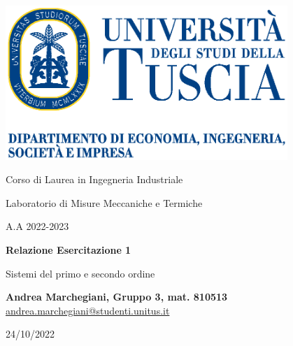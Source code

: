 \documentclass[a4paper, 12pt, twoside]{report}
\begin{document}
			\begin{titlepage}
				\begin{center}
					
					\includegraphics[width=0.8\textwidth]{figures/unitus_marchio_2020_DEIM}
					
					\vspace{0.5cm}
					
					{\Large Corso di Laurea in Ingegneria Industriale}
					
					\vspace{0.5cm}
					
					{\Large Laboratorio di Misure Meccaniche e Termiche}
					
					\vspace{0.5cm}
					
					{\Large A.A 2022-2023}
					
					\vspace{1.5cm}
					
					\textbf{{\Huge Relazione Esercitazione 1}}
					
					\vspace{0.5cm}
					{\LARGE Sistemi del primo e secondo ordine}
					
					\vspace{1.5cm}
					
					\textbf{Andrea Marchegiani, Gruppo 3, mat. 810513}\\
					\href{mailto:andrea.marchegiani@studenti.unitus.it}{andrea.marchegiani@studenti.unitus.it} 
					
					
					\vfill
					
					
					
					24/10/2022
					
				\end{center}
			\end{titlepage}
			
			
			\tableofcontents 
			\newpage
		
\end{document}
